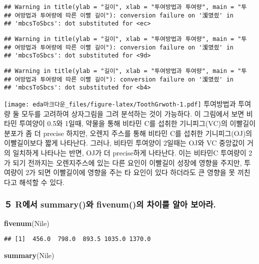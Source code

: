 \documentclass[]{article}
\newenvironment{Shaded}{\begin{snugshade}}{\end{snugshade}}
\newcommand{\KeywordTok}[1]{\textcolor[rgb]{0.13,0.29,0.53}{\textbf{#1}}}
\newcommand{\NormalTok}[1]{#1}
\begin{document}
\begin{verbatim}
## Warning in title(ylab = "길이", xlab = "투여방법과 투여량", main = "투
## 여방법과 투여량에 따른 이빨 길이"): conversion failure on '湲몄씠' in
## 'mbcsToSbcs': dot substituted for <ec>
\end{verbatim}

\begin{verbatim}
## Warning in title(ylab = "길이", xlab = "투여방법과 투여량", main = "투
## 여방법과 투여량에 따른 이빨 길이"): conversion failure on '湲몄씠' in
## 'mbcsToSbcs': dot substituted for <9d>
\end{verbatim}

\begin{verbatim}
## Warning in title(ylab = "길이", xlab = "투여방법과 투여량", main = "투
## 여방법과 투여량에 따른 이빨 길이"): conversion failure on '湲몄씠' in
## 'mbcsToSbcs': dot substituted for <b4>
\end{verbatim}

\texttt{[image: eda마크다운\_files/figure-latex/ToothGrwoth-1.pdf]}
투여방법과 투여량 둘 모두를 고려하여 상자그림을 그려 분석하는 것이
가능하다. 이 그림에서 보면 비타민 투여양이 0.5와 1일때, 약물을 통해
비타민 C를 섭취한 기니피그(VC)의 이빨길이 분포가 좀 더 precise 하지만,
오렌지 주스를 통해 비타민 C를 섭취한 기니피그(OJ)의 이빨길이보다 짧게
나타난다. 그러나, 비타민 투여양이 2일때는 OJ와 VC 중앙값이 거의 일치하게
나타나는 반면, OJ가 더 precise하게 나타난다. 이는 비타민C 투여량이 2가
되기 전까지는 오렌지주스에 있는 다른 요인이 이빨길이 성장에 영향을
주지만, 투여량이 2가 되면 이빨길이에 영향을 주는 타 요인이 있다 하더라도
큰 영향을 못 끼친다고 해석할 수 있다.

\subsubsection{５ R에서 summary()와 fivenum()의 차이를 알아
보아라.}\label{r-summary-fivenum---.}

\begin{Shaded}
\begin{Highlighting}[]
\KeywordTok{fivenum}\NormalTok{(Nile)}
\end{Highlighting}
\end{Shaded}

\begin{verbatim}
## [1]  456.0  798.0  893.5 1035.0 1370.0
\end{verbatim}

\begin{Shaded}
\begin{Highlighting}[]
\KeywordTok{summary}\NormalTok{(Nile)}
\end{Highlighting}
\end{Shaded}
\end{document}
